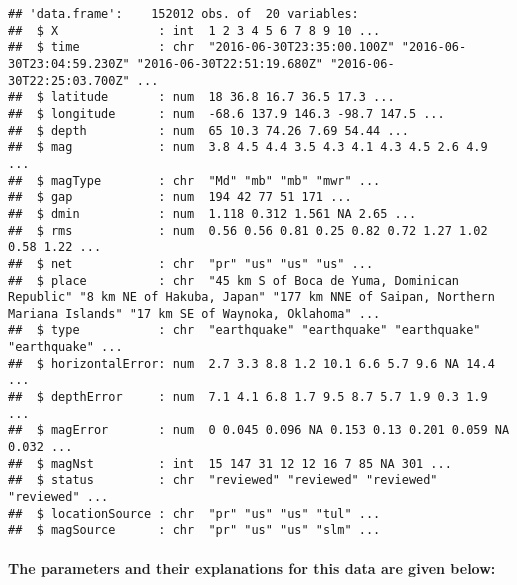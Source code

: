 \documentclass[
]{article}
\begin{document}
\begin{verbatim}
## 'data.frame':    152012 obs. of  20 variables:
##  $ X              : int  1 2 3 4 5 6 7 8 9 10 ...
##  $ time           : chr  "2016-06-30T23:35:00.100Z" "2016-06-30T23:04:59.230Z" "2016-06-30T22:51:19.680Z" "2016-06-30T22:25:03.700Z" ...
##  $ latitude       : num  18 36.8 16.7 36.5 17.3 ...
##  $ longitude      : num  -68.6 137.9 146.3 -98.7 147.5 ...
##  $ depth          : num  65 10.3 74.26 7.69 54.44 ...
##  $ mag            : num  3.8 4.5 4.4 3.5 4.3 4.1 4.3 4.5 2.6 4.9 ...
##  $ magType        : chr  "Md" "mb" "mb" "mwr" ...
##  $ gap            : num  194 42 77 51 171 ...
##  $ dmin           : num  1.118 0.312 1.561 NA 2.65 ...
##  $ rms            : num  0.56 0.56 0.81 0.25 0.82 0.72 1.27 1.02 0.58 1.22 ...
##  $ net            : chr  "pr" "us" "us" "us" ...
##  $ place          : chr  "45 km S of Boca de Yuma, Dominican Republic" "8 km NE of Hakuba, Japan" "177 km NNE of Saipan, Northern Mariana Islands" "17 km SE of Waynoka, Oklahoma" ...
##  $ type           : chr  "earthquake" "earthquake" "earthquake" "earthquake" ...
##  $ horizontalError: num  2.7 3.3 8.8 1.2 10.1 6.6 5.7 9.6 NA 14.4 ...
##  $ depthError     : num  7.1 4.1 6.8 1.7 9.5 8.7 5.7 1.9 0.3 1.9 ...
##  $ magError       : num  0 0.045 0.096 NA 0.153 0.13 0.201 0.059 NA 0.032 ...
##  $ magNst         : int  15 147 31 12 12 16 7 85 NA 301 ...
##  $ status         : chr  "reviewed" "reviewed" "reviewed" "reviewed" ...
##  $ locationSource : chr  "pr" "us" "us" "tul" ...
##  $ magSource      : chr  "pr" "us" "us" "slm" ...
\end{verbatim}

\hypertarget{the-parameters-and-their-explanations-for-this-data-are-given-below}{%
\paragraph{The parameters and their explanations for this data are given
below:}\label{the-parameters-and-their-explanations-for-this-data-are-given-below}}
\end{document}
